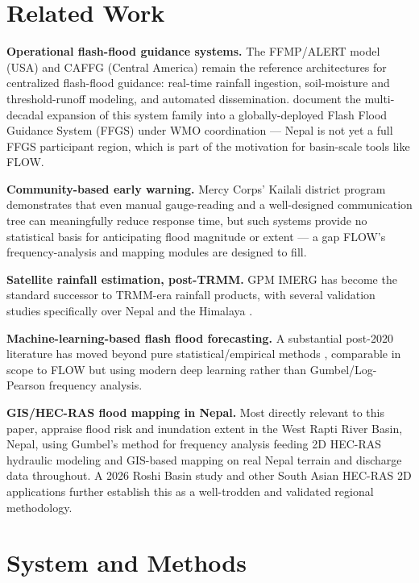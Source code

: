\documentclass[11pt]{article}
\begin{document}
\section{Related Work}

\noindent\textbf{Operational flash-flood guidance systems.} The FFMP/ALERT model (USA) and CAFFG (Central America) remain the reference architectures for centralized flash-flood guidance: real-time rainfall ingestion, soil-moisture and threshold-runoff modeling, and automated dissemination. \citet{gourley2022} document the multi-decadal expansion of this system family into a globally-deployed Flash Flood Guidance System (FFGS) under WMO coordination --- Nepal is not yet a full FFGS participant region, which is part of the motivation for basin-scale tools like FLOW.

\noindent\textbf{Community-based early warning.} Mercy Corps' Kailali district program \citep{smith2017communitybased} demonstrates that even manual gauge-reading and a well-designed communication tree can meaningfully reduce response time, but such systems provide no statistical basis for anticipating flood magnitude or extent --- a gap FLOW's frequency-analysis and mapping modules are designed to fill.

\noindent\textbf{Satellite rainfall estimation, post-TRMM.} GPM IMERG has become the standard successor to TRMM-era rainfall products, with several validation studies specifically over Nepal and the Himalaya \citep{atmosphere2021,remotesensing2022,remotesensing2020,jhydrology2021,ees2025}.

\noindent\textbf{Machine-learning-based flash flood forecasting.} A substantial post-2020 literature has moved beyond pure statistical/empirical methods \citep{water2024review,intelligentflood2023,lesvos2023}, comparable in scope to FLOW but using modern deep learning rather than Gumbel/Log-Pearson frequency analysis.

\noindent\textbf{GIS/HEC-RAS flood mapping in Nepal.} Most directly relevant to this paper, \citet{sharma2025westrapti} appraise flood risk and inundation extent in the West Rapti River Basin, Nepal, using Gumbel's method for frequency analysis feeding 2D HEC-RAS hydraulic modeling and GIS-based mapping on real Nepal terrain and discharge data throughout. A 2026 Roshi Basin study \citep{roshi2026} and other South Asian HEC-RAS 2D applications \citep{pandit2023kamla,vashist2023krishna} further establish this as a well-trodden and validated regional methodology.

\section{System and Methods}
\end{document}
